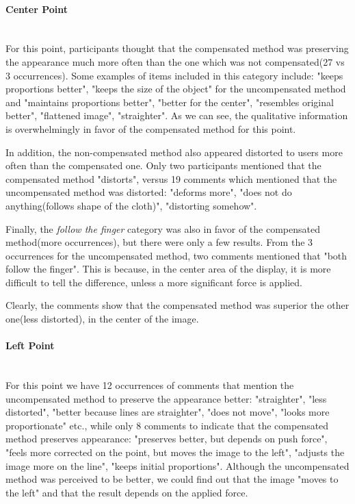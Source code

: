 \documentclass[]{article}
\begin{document}
\paragraph{Center Point}\mbox{}\\


For this point, participants thought that the compensated method was preserving the appearance much  more often than the one which was not compensated(27 vs 3 occurrences). Some examples of items included in this category include: "keeps proportions better", "keeps the size of the object" for the uncompensated method and
"maintains proportions better", "better for the center", "resembles original better", "flattened image", "straighter". As we can see, the qualitative information is overwhelmingly in favor of the compensated method for this point. 

In addition, the non-compensated method also appeared distorted to users more often than the compensated one. Only two participants mentioned that the compensated method "distorts", versus 19 comments which mentioned that the uncompensated method was distorted: "deforms more", "does not do anything(follows shape of the cloth)", "distorting somehow".

Finally, the \textit{follow the finger} category was also in favor of the compensated method(more occurrences), but there were only a few results. From the 3 occurrences for the uncompensated method, two comments mentioned that "both follow the finger". This is because, in the center area of the display, it is more difficult to tell the difference, unless a more significant force is applied.

Clearly, the comments show that the compensated method was superior the other one(less distorted), in the center of the image.

\paragraph{Left Point}\mbox{}\\

For this point we have 12 occurrences of comments that mention the uncompensated method to preserve the appearance better: "straighter", "less distorted", "better because lines are straighter", "does not move", "looks more proportionate" etc., while only 8 comments to indicate that the compensated method preserves appearance:
"preserves better, but depends on push force", "feels more corrected on the point, but moves the image to the left", "adjusts the image more on the line", "keeps initial proportions". Although the uncompensated method was perceived to be better, we could find out that the image "moves to the left" and that the result depends on the applied force.
\end{document}
